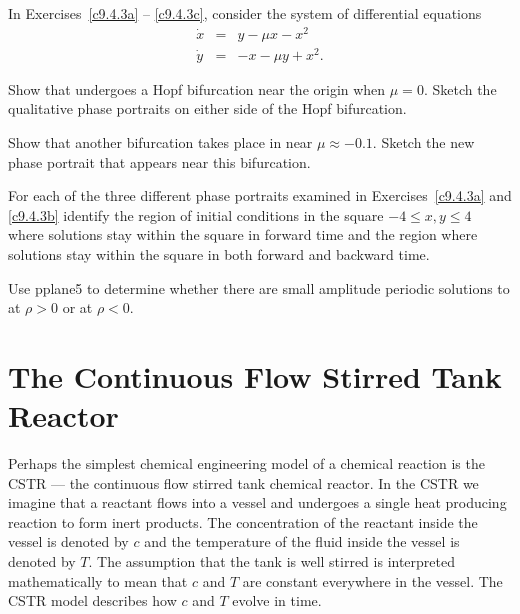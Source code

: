 \documentclass{ximera}
\begin{document}
\noindent In Exercises~\ref{c9.4.3a} -- \ref{c9.4.3c}, 
consider the system of differential equations 
\begin{equation*}  \label{E:duff}
\begin{array}{rcl}
\dot{x} & = & y - \mu x - x^2   \\
\dot{y} & = & -x - \mu y + x^2.
\end{array}
\end{equation*}
\begin{exercise} \label{c9.4.3a}
Show that  undergoes a Hopf bifurcation near the origin when 
$\mu=0$.  Sketch the qualitative phase portraits on either 
side of the Hopf bifurcation.
\end{exercise}
\begin{exercise} \label{c9.4.3b}
Show that another bifurcation takes place in  near 
$\mu\approx -0.1$.  Sketch the new phase portrait that appears near this 
bifurcation.    
\end{exercise}
\begin{exercise} \label{c9.4.3c}
For each of the three different phase portraits examined in 
Exercises~\ref{c9.4.3a} and \ref{c9.4.3b} identify the region of initial 
conditions in the square $-4\leq x,y \leq 4$ where solutions stay within the 
square in forward time and the region where solutions stay within the square 
in both forward and backward time.
\end{exercise}

\begin{exercise} \label{c9.4.4}
Use {\sf pplane5} to determine whether there are small amplitude periodic 
solutions to  at $\rho>0$ or at $\rho<0$.
\end{exercise}



\section{The Continuous Flow Stirred Tank Reactor} 
\label{S:CSTR} 

Perhaps the simplest chemical engineering model of a chemical
reaction is the CSTR --- the continuous flow stirred tank
chemical reactor.  In the CSTR we imagine that a reactant flows
into a vessel and undergoes a single heat producing reaction to
form inert products.  The concentration of the reactant inside
the vessel is denoted by $c$ and the temperature of the fluid
inside the vessel is denoted by $T$.  The assumption that the
tank is well stirred is interpreted mathematically to mean that
$c$ and $T$ are constant everywhere in the vessel.  The CSTR
model describes how $c$ and $T$ evolve in time. 
\end{document}

